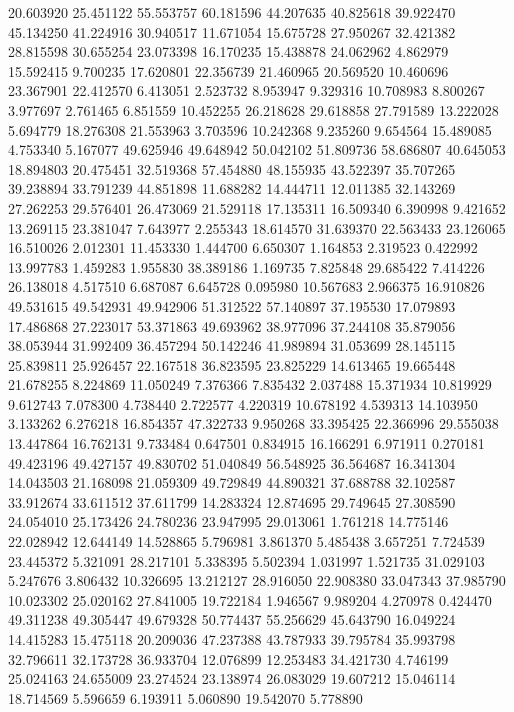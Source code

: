 20.603920
25.451122
55.553757
60.181596
44.207635
40.825618
39.922470
45.134250
41.224916
30.940517
11.671054
15.675728
27.950267
32.421382
28.815598
30.655254
23.073398
16.170235
15.438878
24.062962
4.862979
15.592415
9.700235
17.620801
22.356739
21.460965
20.569520
10.460696
23.367901
22.412570
6.413051
2.523732
8.953947
9.329316
10.708983
8.800267
3.977697
2.761465
6.851559
10.452255
26.218628
29.618858
27.791589
13.222028
5.694779
18.276308
21.553963
3.703596
10.242368
9.235260
9.654564
15.489085
4.753340
5.167077
49.625946
49.648942
50.042102
51.809736
58.686807
40.645053
18.894803
20.475451
32.519368
57.454880
48.155935
43.522397
35.707265
39.238894
33.791239
44.851898
11.688282
14.444711
12.011385
32.143269
27.262253
29.576401
26.473069
21.529118
17.135311
16.509340
6.390998
9.421652
13.269115
23.381047
7.643977
2.255343
18.614570
31.639370
22.563433
23.126065
16.510026
2.012301
11.453330
1.444700
6.650307
1.164853
2.319523
0.422992
13.997783
1.459283
1.955830
38.389186
1.169735
7.825848
29.685422
7.414226
26.138018
4.517510
6.687087
6.645728
0.095980
10.567683
2.966375
16.910826
49.531615
49.542931
49.942906
51.312522
57.140897
37.195530
17.079893
17.486868
27.223017
53.371863
49.693962
38.977096
37.244108
35.879056
38.053944
31.992409
36.457294
50.142246
41.989894
31.053699
28.145115
25.839811
25.926457
22.167518
36.823595
23.825229
14.613465
19.665448
21.678255
8.224869
11.050249
7.376366
7.835432
2.037488
15.371934
10.819929
9.612743
7.078300
4.738440
2.722577
4.220319
10.678192
4.539313
14.103950
3.133262
6.276218
16.854357
47.322733
9.950268
33.395425
22.366996
29.555038
13.447864
16.762131
9.733484
0.647501
0.834915
16.166291
6.971911
0.270181
49.423196
49.427157
49.830702
51.040849
56.548925
36.564687
16.341304
14.043503
21.168098
21.059309
49.729849
44.890321
37.688788
32.102587
33.912674
33.611512
37.611799
14.283324
12.874695
29.749645
27.308590
24.054010
25.173426
24.780236
23.947995
29.013061
1.761218
14.775146
22.028942
12.644149
14.528865
5.796981
3.861370
5.485438
3.657251
7.724539
23.445372
5.321091
28.217101
5.338395
5.502394
1.031997
1.521735
31.029103
5.247676
3.806432
10.326695
13.212127
28.916050
22.908380
33.047343
37.985790
10.023302
25.020162
27.841005
19.722184
1.946567
9.989204
4.270978
0.424470
49.311238
49.305447
49.679328
50.774437
55.256629
45.643790
16.049224
14.415283
15.475118
20.209036
47.237388
43.787933
39.795784
35.993798
32.796611
32.173728
36.933704
12.076899
12.253483
34.421730
4.746199
25.024163
24.655009
23.274524
23.138974
26.083029
19.607212
15.046114
18.714569
5.596659
6.193911
5.060890
19.542070
5.778890
